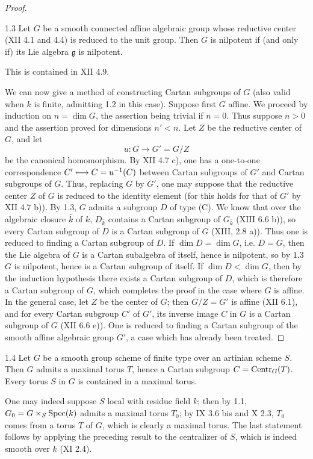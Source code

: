 \begin{proof}
\begin{lemma}{1.3}\label{XIV.1.3}
Let $G$ be a smooth connected affine algebraic group whose reductive
center (XII 4.1 and 4.4) is reduced to the unit group. Then $G$ is
nilpotent if (and only if) its Lie algebra $\mathfrak g$ is nilpotent.
\end{lemma}
This is contained in XII 4.9.

We can now give a method of constructing Cartan subgroups of $G$
(also valid when $k$ is finite, admitting 1.2 in this case). Suppose
first $G$ affine. We proceed by induction on $n=\dim G$, the assertion
being trivial if $n=0$. Thus suppose $n>0$ and the assertion proved
for dimensions $n'<n$. Let $Z$ be the reductive center of $G$, and let
\[
 u:G\longrightarrow G'=G/Z
\]
be the canonical homomorphism. By XII 4.7 c), one has a one-to-one
correspondence $C'\longmapsto C=u^{-1}(C)$ between Cartan subgroups of $G'$
and Cartan subgroups of $G$. Thus, replacing $G$ by $G'$, one may
suppose that the reductive center $Z$ of $G$ is reduced to the identity
element (for this holds for that of $G'$ by XII 4.7 b)). By 1.3,
$G$ admits a subgroup $D$ of type (C). We know that over the algebraic
closure $\bar k$ of $k$, $D_{\bar k}$ contains a Cartan subgroup of
$G_{\bar k}$ (XIII 6.6 b)), so every Cartan subgroup of $D$ is a
Cartan subgroup of $G$ (XIII, 2.8 a)). Thus one is reduced to finding
a Cartan subgroup of $D$. If $\dim D=\dim G$, i.e. $D=G$, then the
Lie algebra of $G$ is a Cartan subalgebra of itself, hence is nilpotent,
so by 1.3 $G$ is nilpotent, hence is a Cartan subgroup of itself.
If $\dim D<\dim G$, then by the induction hypothesis there exists
a Cartan subgroup of $D$, which is therefore a Cartan subgroup of
$G$, which completes the proof in the case where $G$ is affine.
In the general case, let $Z$ be the center of $G$; then $G/Z=G'$
is affine (XII 6.1), and for every Cartan subgroup $C'$ of $G'$, its
inverse image $C$ in $G$ is a Cartan subgroup of $G$ (XII 6.6 e)).
One is reduced to finding a Cartan subgroup of the smooth affine
algebraic group $G'$, a case which has already been treated.
\end{proof}

\begin{corollary}{1.4}\label{XIV.1.4}
Let $G$ be a smooth group scheme of finite type over an artinian scheme
$S$. Then $G$ admits a maximal torus $T$, hence a Cartan subgroup
$C=\operatorname{Centr}_G(T)$. Every torus $S$ in $G$ is contained in a maximal torus.
\end{corollary}
One may indeed suppose $S$ local with residue field $k$; then by 1.1,
$G_0=G\times_S\operatorname{Spec}(k)$ admits a maximal torus $T_0$; by IX 3.6 bis
and X 2.3, $T_0$ comes from a torus $T$ of $G$, which is clearly a
maximal torus. The last statement follows by applying the preceding
result to the centralizer of $S$, which is indeed smooth over $k$
(XI 2.4).

